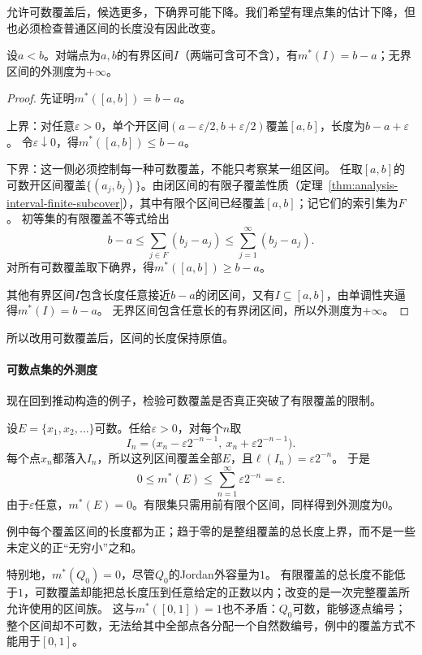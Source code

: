 允许可数覆盖后，候选更多，下确界可能下降。我们希望有理点集的估计下降，但也必须检查普通区间的长度没有因此改变。
\begin{lemma}[区间的外测度等于长度]
\label{lem:set-measure-interval-outer-measure}
设$a<b$。对端点为$a,b$的有界区间$I$（两端可含可不含），有$m^*(I)=b-a$；无界区间的外测度为$+\infty$。
\end{lemma}
\begin{proof}
先证明$m^*([a,b])=b-a$。

上界：对任意$\varepsilon>0$，单个开区间$(a-\varepsilon/2,b+\varepsilon/2)$覆盖$[a,b]$，长度为$b-a+\varepsilon$。
令$\varepsilon\downarrow0$，得$m^*([a,b])\leq b-a$。

下界：这一侧必须控制每一种可数覆盖，不能只考察某一组区间。
任取$[a,b]$的可数开区间覆盖$\{(a_j,b_j)\}$。由闭区间的有限子覆盖性质（定理~\ref{thm:analysis-interval-finite-subcover}），其中有限个区间已经覆盖$[a,b]$；记它们的索引集为$F$。
初等集的有限覆盖不等式给出
\[
 b-a\leq\sum_{j\in F}(b_j-a_j)\leq\sum_{j=1}^{\infty}(b_j-a_j).
\]
对所有可数覆盖取下确界，得$m^*([a,b])\geq b-a$。

其他有界区间$I$包含长度任意接近$b-a$的闭区间，又有$I\subseteq[a,b]$，由单调性夹逼得$m^*(I)=b-a$。
无界区间包含任意长的有界闭区间，所以外测度为$+\infty$。
\end{proof}

所以改用可数覆盖后，区间的长度保持原值。

\paragraph{可数点集的外测度}

现在回到推动构造的例子，检验可数覆盖是否真正突破了有限覆盖的限制。
\begin{example}[可数点集的外测度为零]
\label{ex:set-measure-countable-outer-null}
设$E=\{x_1,x_2,\ldots\}$可数。任给$\varepsilon>0$，对每个$n$取
\[
 I_n=\bigl(x_n-\varepsilon2^{-n-1},\ x_n+\varepsilon2^{-n-1}\bigr).
\]
每个点$x_n$都落入$I_n$，所以这列区间覆盖全部$E$，且$\ell(I_n)=\varepsilon2^{-n}$。
于是
\[
 0\leq m^*(E)\leq\sum_{n=1}^{\infty}\varepsilon2^{-n}=\varepsilon.
\]
由于$\varepsilon$任意，$m^*(E)=0$。有限集只需用前有限个区间，同样得到外测度为$0$。
\end{example}

例中每个覆盖区间的长度都为正；趋于零的是整组覆盖的总长度上界，而不是一些未定义的正“无穷小”之和。

特别地，$m^*(Q_0)=0$，尽管$Q_0$的Jordan外容量为$1$。
有限覆盖的总长度不能低于$1$，可数覆盖却能把总长度压到任意给定的正数以内；改变的是一次完整覆盖所允许使用的区间族。
这与$m^*([0,1])=1$也不矛盾：$Q_0$可数，能够逐点编号；整个区间却不可数，无法给其中全部点各分配一个自然数编号，例中的覆盖方式不能用于$[0,1]$。

